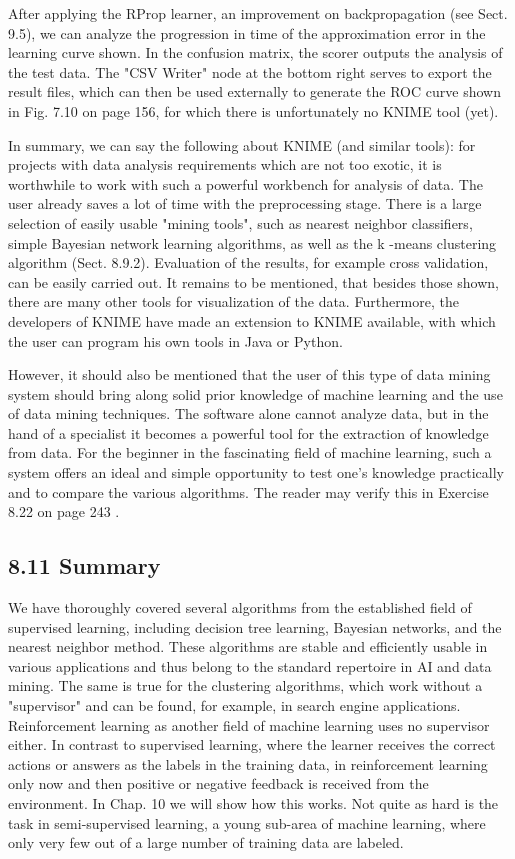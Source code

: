 \documentclass[10pt]{article}
\begin{document}
After applying the RProp learner, an improvement on backpropagation (see Sect. 9.5), we can analyze the progression in time of the approximation error in the learning curve shown. In the confusion matrix, the scorer outputs the analysis of the test data. The "CSV Writer" node at the bottom right serves to export the result files, which can then be used externally to generate the ROC curve shown in Fig. 7.10 on page 156, for which there is unfortunately no KNIME tool (yet).

In summary, we can say the following about KNIME (and similar tools): for projects with data analysis requirements which are not too exotic, it is worthwhile to work with such a powerful workbench for analysis of data. The user already saves a lot of time with the preprocessing stage. There is a large selection of easily usable "mining tools", such as nearest neighbor classifiers, simple Bayesian network learning algorithms, as well as the k -means clustering algorithm (Sect. 8.9.2). Evaluation of the results, for example cross validation, can be easily carried out. It remains to be mentioned, that besides those shown, there are many other tools for visualization of the data. Furthermore, the developers of KNIME have made an extension to KNIME available, with which the user can program his own tools in Java or Python.

However, it should also be mentioned that the user of this type of data mining system should bring along solid prior knowledge of machine learning and the use of data mining techniques. The software alone cannot analyze data, but in the hand of a specialist it becomes a powerful tool for the extraction of knowledge from data. For the beginner in the fascinating field of machine learning, such a system offers an ideal and simple opportunity to test one's knowledge practically and to compare the various algorithms. The reader may verify this in Exercise 8.22 on page 243 .

\subsection*{8.11 Summary}
We have thoroughly covered several algorithms from the established field of supervised learning, including decision tree learning, Bayesian networks, and the nearest neighbor method. These algorithms are stable and efficiently usable in various applications and thus belong to the standard repertoire in AI and data mining. The same is true for the clustering algorithms, which work without a "supervisor" and can be found, for example, in search engine applications. Reinforcement learning as another field of machine learning uses no supervisor either. In contrast to supervised learning, where the learner receives the correct actions or answers as the labels in the training data, in reinforcement learning only now and then positive or negative feedback is received from the environment. In Chap. 10 we will show how this works. Not quite as hard is the task in semi-supervised learning, a young sub-area of machine learning, where only very few out of a large number of training data are labeled.
\end{document}
